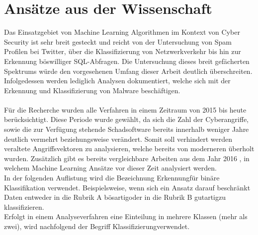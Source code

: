 \documentclass[
    12pt, %
    DIV10,
    ngerman, %
    a4paper, %
    oneside, %
    titlepage, %
    parskip=half, %
    headings=normal, %
    listof=totoc, %
    bibliography=totoc, %
    index=totoc, %
    captions=tableheading, %
    final %
]{scrreprt}
\begin{document}
\section{Ansätze aus der Wissenschaft}
\label{sec:aw}
Das Einsatzgebiet von Machine Learning Algorithmen im Kontext von Cyber Security ist sehr breit gesteckt und reicht von der Untersuchung von Spam Profilen bei Twitter, über die Klassifizierung von Netzwerkverkehr bis hin zur Erkennung böswilliger SQL-Abfragen. Die Untersuchung dieses breit gefächerten Spektrums würde den vorgesehenen Umfang dieser Arbeit deutlich überschreiten. Infolgedessen werden lediglich Analysen dokumentiert, welche sich mit der Erkennung und Klassifizierung von Malware beschäftigen.
\\\\
Für die Recherche wurden alle Verfahren in einem Zeitraum von 2015 bis heute berücksichtigt. Diese Periode wurde gewählt, da sich die Zahl der Cyberangriffe, sowie die zur Verfügung stehende Schadsoftware bereits innerhalb weniger Jahre deutlich vermehrt beziehungsweise verändert. Somit soll verhindert werden veraltete Angriffsvektoren zu analysieren, welche bereits von moderneren überholt wurden. Zusätzlich gibt es bereits vergleichbare Arbeiten aus dem Jahr 2016 \parencite[s.][]{Buczak2016}, in welchem Machine Learning Ansätze vor dieser Zeit analysiert werden.\\
In der folgenden Auflistung wird die Bezeichnung \glqq Erkennung\grqq für binäre Klassifikation verwendet. Beispielsweise, wenn sich ein Ansatz darauf beschränkt Daten entweder in die Rubrik A \glqq bösartig\grqq oder in die Rubrik B \glqq gutartig\grqq zu klassifizieren.\\
Erfolgt in einem Analyseverfahren eine Einteilung in mehrere Klassen (mehr als zwei), wird nachfolgend der Begriff 
\glqq Klassifizierung\grqq verwendet.
\\\\
\end{document}
